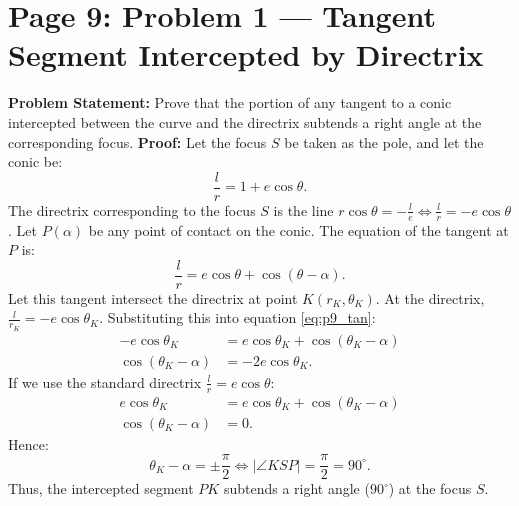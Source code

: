 \newpage
\section{Page 9: Problem 1 --- Tangent Segment Intercepted by Directrix}
\label{sec:page09}

\begin{examplebox}
\textbf{Problem Statement:}
Prove that the portion of any tangent to a conic intercepted between the curve and the directrix subtends a right angle at the corresponding focus.
\tcblower
\textbf{Proof:}
Let the focus $S$ be taken as the pole, and let the conic be:
\begin{equation}
    \frac{l}{r} = 1 + e\cos\theta.
\end{equation}
The directrix corresponding to the focus $S$ is the line $r\cos\theta = -\frac{l}{e} \iff \frac{l}{r} = -e\cos\theta$.
Let $P(\alpha)$ be any point of contact on the conic. The equation of the tangent at $P$ is:
\begin{equation}
    \frac{l}{r} = e\cos\theta + \cos(\theta - \alpha). \label{eq:p9_tan}
\end{equation}
Let this tangent intersect the directrix at point $K(r_K, \theta_K)$.
At the directrix, $\frac{l}{r_K} = -e\cos\theta_K$.
Substituting this into equation \eqref{eq:p9_tan}:
\begin{align}
    -e\cos\theta_K &= e\cos\theta_K + \cos(\theta_K - \alpha) \nonumber\\
    \cos(\theta_K - \alpha) &= -2e\cos\theta_K.
\end{align}
If we use the standard directrix $\frac{l}{r} = e\cos\theta$:
\begin{align}
    e\cos\theta_K &= e\cos\theta_K + \cos(\theta_K - \alpha) \nonumber\\
    \cos(\theta_K - \alpha) &= 0.
\end{align}
Hence:
\begin{equation}
    \theta_K - \alpha = \pm \frac{\pi}{2} \iff |\angle KSP| = \frac{\pi}{2} = 90^\circ.
\end{equation}
Thus, the intercepted segment $PK$ subtends a right angle ($90^\circ$) at the focus $S$.
\end{examplebox}

\newpage
